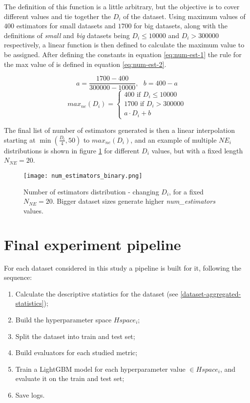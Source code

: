The definition of this function is a little arbitrary, but the objective is to cover different values and tie together the $D_i$ of the dataset. Using maximum values of $400$ estimators for small datasets and $1700$ for big datasets, along with the definitions of \textit{small} and \textit{big} datasets being $D_i\leq10000$ and $D_i>300000$ respectively, a linear function is then defined to calculate the maximum value to be assigned. After defining the constants in equation \ref{eq:num-est-1} the rule for the max value of  is defined in equation \ref{eq:num-est-2}.

\begin{equation}
    a = \frac{1700 - 400}{300000 - 10000}, \text{ }b = 400 - a
    \label{eq:num-est-1}
\end{equation}
\begin{equation}
    max_{ne}(D_i) = \begin{cases}
        400 \text{ if } D_i \leq 10000 \\
        1700 \text{ if } D_i > 300000 \\
        a \cdot D_i + b
    \end{cases}
    \label{eq:num-est-2}
\end{equation}

The final list of number of estimators generated is then a linear interpolation starting at $\min(\frac{D_i}{4}, 50)$ to $max_{ne}(D_i)$, and an example of multiple $NE_i$ distributions is shown in figure \ref{fig:hyperparam-ne1} for different $D_i$ values, but with a fixed length $N_{NE} = 20$.

\begin{figure}[!h]
    \centering
    \texttt{[image: num\_estimators\_binary.png]} 
    \caption{Number of estimators distribution - changing $D_i$, for a fixed $N_{NE} = 20$. Bigger dataset sizes generate higher \textit{num\_estimators} values.}
    \label{fig:hyperparam-ne1}
\end{figure}

\section{Final experiment pipeline}

For each dataset considered in this study a pipeline is built for it, following the sequence:

\begin{enumerate}
    \item Calculate the descriptive statistics for the dataset (see \ref{dataset-aggregated-statistics});
    \item Build the hyperparameter space $Hspace_i$;
    \item Split the dataset into train and test set;
    \item Build evaluators for each studied metric;
    \item Train a LightGBM model for each hyperparameter value $\in Hspace_i$, and evaluate it on the train and test set;
    \item Save logs.
\end{enumerate}

